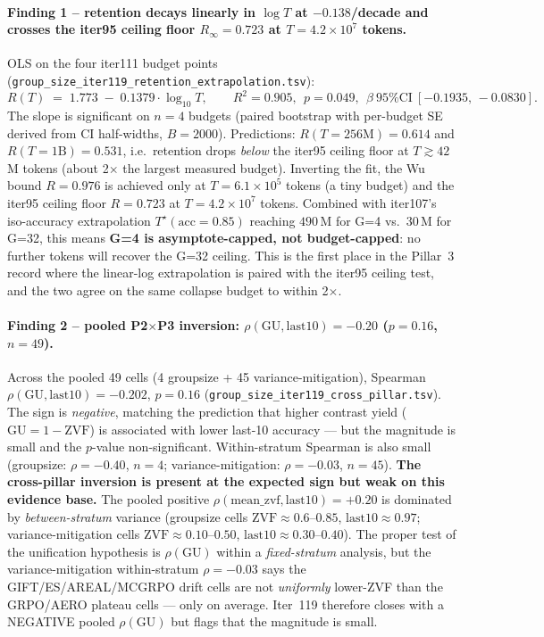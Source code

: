 \paragraph{Finding 1 -- retention decays linearly in $\log T$ at
$-0.138$/decade and crosses the iter95 ceiling floor $R_\infty{=}0.723$ at
$T{=}4.2{\times}10^{7}$ tokens.}
OLS on the four iter111 budget points
(\texttt{group\_size\_iter119\_retention\_extrapolation.tsv}):
\[
R(T) \;=\; 1.773 \;-\; 0.1379 \cdot \log_{10}T,\qquad
R^{2}{=}0.905,\ \ p{=}0.049,\ \
\beta\ \text{95\% CI}\ [-0.1935,\,-0.0830].
\]
The slope is significant on $n{=}4$ budgets (paired bootstrap with
per-budget SE derived from CI half-widths, $B{=}2000$).  Predictions:
$R(T{=}256\mathrm{M}){=}0.614$ and $R(T{=}1\mathrm{B}){=}0.531$, i.e.\
retention drops \emph{below} the iter95 ceiling floor at $T{\gtrsim}42\,$M
tokens (about 2$\times$ the largest measured budget).  Inverting the
fit, the Wu bound $R{=}0.976$ is achieved only at $T{=}6.1{\times}10^{5}$
tokens (a tiny budget) and the iter95 ceiling floor $R{=}0.723$ at
$T{=}4.2{\times}10^{7}$ tokens.  Combined with iter107's
iso-accuracy extrapolation $T^\star(\mathrm{acc}{=}0.85)$ reaching
$490\,$M for G=4 vs.\ $30\,$M for G=32, this means
\textbf{G=4 is asymptote-capped, not budget-capped}: no further
tokens will recover the G=32 ceiling.  This is the first place in the
Pillar~3 record where the linear-log extrapolation is paired with
the iter95 ceiling test, and the two agree on the same collapse
budget to within 2$\times$.

\paragraph{Finding 2 -- pooled P2$\times$P3 inversion: $\rho(\mathrm{GU},
\mathrm{last10}){=}{-}0.20$ ($p{=}0.16$, $n{=}49$).}
Across the pooled 49 cells (4 groupsize + 45 variance-mitigation),
Spearman $\rho(\mathrm{GU}, \mathrm{last10}){=}{-}0.202$, $p{=}0.16$
(\texttt{group\_size\_iter119\_cross\_pillar.tsv}).  The sign is
\emph{negative}, matching the prediction that higher contrast yield
($\mathrm{GU}{=}1{-}\mathrm{ZVF}$) is associated with lower
last-10 accuracy --- but the magnitude is small and the $p$-value
non-significant.  Within-stratum Spearman is also small
(groupsize: $\rho{=}{-}0.40$, $n{=}4$; variance-mitigation:
$\rho{=}{-}0.03$, $n{=}45$).  \textbf{The cross-pillar inversion is
present at the expected sign but weak on this evidence base.}
The pooled positive $\rho(\mathrm{mean\_zvf}, \mathrm{last10}){=}{+}0.20$
is dominated by \emph{between-stratum} variance (groupsize cells
$\mathrm{ZVF}{\approx}0.6$--$0.85$, $\mathrm{last10}{\approx}0.97$;
variance-mitigation cells $\mathrm{ZVF}{\approx}0.10$--$0.50$,
$\mathrm{last10}{\approx}0.30$--$0.40$).  The proper test of the
unification hypothesis is $\rho(\mathrm{GU})$ within a
\emph{fixed-stratum} analysis, but the variance-mitigation within-stratum
$\rho{=}{-}0.03$ says the GIFT/ES/AREAL/MCGRPO drift cells are not
\emph{uniformly} lower-ZVF than the GRPO/AERO plateau cells --- only
on average.  Iter~119 therefore closes with a NEGATIVE pooled
$\rho(\mathrm{GU})$ but flags that the magnitude is small.

